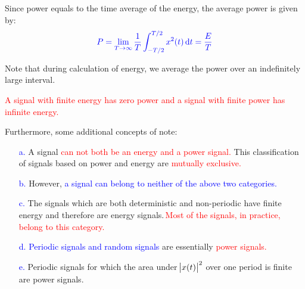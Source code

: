 \documentclass[
  12pt,
  a4paper,
]{report}
\newcommand{\bluetext}[1]{\textcolor{blue}{#1}}
\begin{document}
\begin{tcolorbox}[colback=boxbodycol, colframe=boxheadcol, title=\textcolor{red}{\textbf{Average Power}}]\label{fig:average-power-def}
Since power equals to the time average of the energy, the average power is given by:
    \begin{equation}     
        \label{eq:average-power-def}     
        \textcolor{blue}{P = \lim_{T \to \infty} \frac{1}{T} \int_{-T/2}^{T/2} x^2(t) \dd{t} = \frac{E}{T}}
    \end{equation}
\end{tcolorbox}

Note that during calculation of energy, we average the power over an indefinitely large interval.\\ \begin{tcolorbox}[colback=boxbodycol,colframe=boxheadcol]\label{fig:energy-power-relationship-1}     
    \begin{center}         
        \textcolor{red}{A signal with finite energy has zero power and a signal with finite power has infinite energy.}     
    \end{center} 
\end{tcolorbox}

Furthermore, some additional concepts of note:\\ 
\begin{tcolorbox}[colback=boxbodycol,colframe=boxheadcol]
\label{fig:energy-power-relationship-itemize}
    \begin{center}
        \begin{itemize}             
            \item[\bluetext{a.}] A signal \textcolor{red}{can not both be an energy and a power signal.} This classification of signals based on power and energy are \textcolor{red}{mutually exclusive.}             
            \item[\bluetext{b.}] However, \bluetext{a signal can belong to neither of the above two categories.}             
            \item[\bluetext{c.}] The signals which are both deterministic and non-periodic have finite energy and therefore are energy signals.\,\textcolor{red}{Most of the signals, in practice, belong to this category.}             
            \item[\bluetext{d.}] \bluetext{Periodic signals and random signals} are essentially \textcolor{red}{power signals.}             
            \item[\bluetext{e.}] Periodic signals for which the area under \(\abs{x(t)}^2\) over one period is finite are power signals.         
        \end{itemize}     
    \end{center} 
\end{tcolorbox}
\end{document}
